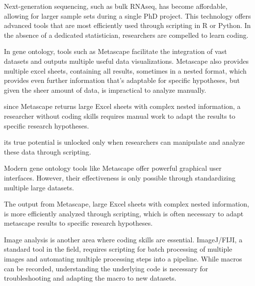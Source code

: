 
Next-generation sequencing, such as bulk RNAseq, has become affordable, allowing
for larger sample sets during a single PhD project. This technology offers
advanced tools that are most efficiently used through scripting in R or Python.
In the absence of a dedicated statistician, researchers are compelled to learn
coding.

In gene ontology, tools such as Metascape facilitate the integration of vast
datasets and outputs multiple useful data visualizations. Metascape also
provides multiple excel sheets, containing all results, sometimes in a nested
format, which provides even further information that's adaptable for specific
hypotheses, but given the sheer amount of data, is impractical to analyze
manually.

since Metascape
returns large Excel sheets with complex nested information, a researcher without
coding skills requires manual work to adapt the results to specific research
hypotheses.

its true potential is unlocked only when researchers can
manipulate and analyze these data through scripting.

Modern gene ontology tools like Metascape offer powerful graphical user
interfaces. However, their effectiveness is only possible through standardizing
multiple large datasets.

The output from Metascape, large Excel sheets with
complex nested information, is more efficiently analyzed through scripting,
which is often necessary to adapt metascape results to specific research
hypotheses.



Image analysis is another area where coding skills are essential. ImageJ/FIJI, a
standard tool in the field, requires scripting for batch processing of multiple
images and automating multiple processing steps into a pipeline. While macros
can be recorded, understanding the underlying code is necessary for
troubleshooting and adapting the macro to new datasets.

